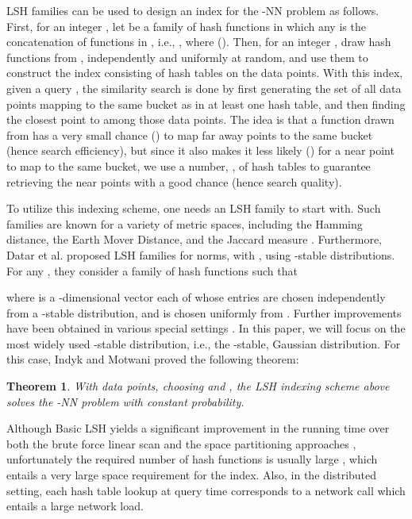 \documentclass{acm_proc_article-sp}
\numberwithin{equation}{section}
\numberwithin{figure}{section}
\newtheorem{thm}{Theorem}
\begin{document}
LSH families can be used to design an index for the -NN problem as follows. First, for an integer , let  be a family of hash functions in which any  is the concatenation of  functions in , i.e., , where  (). Then, for an integer , draw  hash functions from , independently and uniformly at random, and use them to construct the index consisting of  hash tables on the data points. With this index, given a query , the similarity search is done by first generating the set of all data points mapping to the same bucket as  in at least one hash table, and then finding the closest point to  among those data points. The idea is that a function drawn from  has a very small chance () to map far away points to the same bucket (hence search efficiency), but since it also makes it less likely () for a near point to map to the same bucket, we use a number, , of hash tables to guarantee retrieving the near points with a good chance (hence search quality).






To utilize this indexing scheme, one needs an LSH family  to start with. Such families are known for a variety of metric spaces, including the Hamming distance, the Earth Mover Distance, and the Jaccard measure \cite{C02}. Furthermore, Datar et al. \cite{DIIM04} proposed LSH families for  norms, with , using -stable distributions. For any , they consider a family of hash functions  such that 
 
where  is a -dimensional vector each of whose entries are chosen independently from a -stable distribution, and  is chosen uniformly from . Further improvements have been obtained in various special settings \cite{AI06}. In this paper, we will focus on the most widely used -stable distribution, i.e., the -stable, Gaussian distribution. For this case, Indyk and Motwani \cite{im98} proved the following theorem: 

\begin{thm} With  data points, choosing  and , the LSH indexing scheme above solves the -NN problem with constant probability.
\end{thm}

Although Basic LSH yields a significant improvement in the running time over both the brute force linear scan and the space partitioning approaches \cite{expt:space:partitioning, Kakade:covertrees, Krauthgamer:lee:navigating:nets}, unfortunately the required number of hash functions is usually large \cite{Buhler, gim99}, which entails a very large space requirement for the index. Also, in the distributed setting, each hash table lookup at query time corresponds to a network call which entails a large network load.
\end{document}
